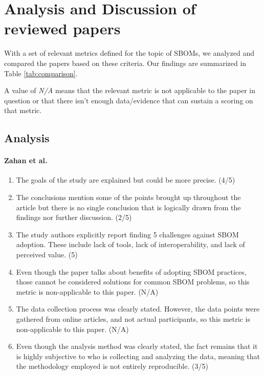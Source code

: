 \section{Analysis and Discussion of reviewed papers} \label{analysis-discussion}

With a set of relevant metrics defined for the topic of SBOMs, we analyzed and compared the papers based on these criteria. Our findings are summarized in Table \ref{tab:comparison}.

A value of \emph{N/A} means that the relevant metric is not applicable to the paper in question or that there isn't enough data/evidence that can sustain a scoring on that metric.

\subsection{Analysis} \label{analysis}

\paragraph{Zahan et al. \cite{article:sbom-required}}

\begin{enumerate}
    \item The goals of the study are explained but could be more precise. (4/5)
    \item The conclusions mention some of the points brought up throughout the article but there is no single conclusion that is logically drawn from the findings nor further discussion. (2/5)
    \item The study authors explicitly report finding 5 challenges against SBOM adoption. These include lack of tools, lack of interoperability, and lack of perceived value. (5)
    \item Even though the paper talks about benefits of adopting SBOM practices, those cannot be considered solutions for common SBOM problems, so this metric is non-applicable to this paper. (N/A)
    \item The data collection process was clearly stated. However, the data points were gathered from online articles, and not actual participants, so this metric is non-applicable to this paper. (N/A)
    \item Even though the analysis method was clearly stated, the fact remains that it is highly subjective to who is collecting and analyzing the data, meaning that the methodology employed is not entirely reproducible. (3/5)
\end{enumerate}


